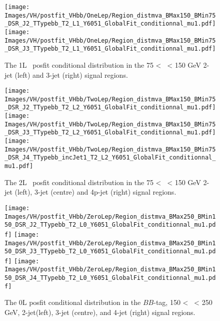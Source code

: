   \begin{figure}[h!]
    \centering
    \texttt{[image: Images/VH/postfit\_VHbb/OneLep/Region\_distmva\_BMax150\_BMin75\_DSR\_J2\_TTypebb\_T2\_L1\_Y6051\_GlobalFit\_conditionnal\_mu1.pdf]}
    \texttt{[image: Images/VH/postfit\_VHbb/OneLep/Region\_distmva\_BMax150\_BMin75\_DSR\_J3\_TTypebb\_T2\_L1\_Y6051\_GlobalFit\_conditionnal\_mu1.pdf]}
    \caption{The 1L \vhb\ posfit conditional distribution in the 75 < \ptv\ < 150 GeV 2-jet (left) and 3-jet (right) signal regions.}
    \label{fig:plotsVHBSR_75pt_1L}
  \end{figure} 
  
  \begin{figure}[h!]
    \centering
    \texttt{[image: Images/VH/postfit\_VHbb/TwoLep/Region\_distmva\_BMax150\_BMin75\_DSR\_J2\_TTypebb\_T2\_L2\_Y6051\_GlobalFit\_conditionnal\_mu1.pdf]}
    \texttt{[image: Images/VH/postfit\_VHbb/TwoLep/Region\_distmva\_BMax150\_BMin75\_DSR\_J3\_TTypebb\_T2\_L2\_Y6051\_GlobalFit\_conditionnal\_mu1.pdf]}
    \texttt{[image: Images/VH/postfit\_VHbb/TwoLep/Region\_distmva\_BMax150\_BMin75\_DSR\_J4\_TTypebb\_incJet1\_T2\_L2\_Y6051\_GlobalFit\_conditionnal\_mu1.pdf]}
    \caption{The 2L \vhb\ posfit conditional distribution in the 75 < \ptv\ < 150 GeV 2-jet (left), 3-jet (centre) and 4p-jet (right) signal regions.}
    \label{fig:plotsVHBSR_75pt_2L}
  \end{figure} 
  




\begin{figure}[h!]
    \centering
    \texttt{[image: Images/VH/postfit\_VHbb/ZeroLep/Region\_distmva\_BMax250\_BMin150\_DSR\_J2\_TTypebb\_T2\_L0\_Y6051\_GlobalFit\_conditionnal\_mu1.pdf]}
    \texttt{[image: Images/VH/postfit\_VHbb/ZeroLep/Region\_distmva\_BMax250\_BMin150\_DSR\_J3\_TTypebb\_T2\_L0\_Y6051\_GlobalFit\_conditionnal\_mu1.pdf]}
    \texttt{[image: Images/VH/postfit\_VHbb/ZeroLep/Region\_distmva\_BMax250\_BMin150\_DSR\_J4\_TTypebb\_T2\_L0\_Y6051\_GlobalFit\_conditionnal\_mu1.pdf]}
    \caption{The 0L posfit conditional distribution in the $BB$-tag, 150 < \ptv\ < 250 GeV, 2-jet(left), 3-jet (centre), and 4-jet (right) signal regions.}
    \label{fig:plotsVHBSR_150pt_0L}
\end{figure} 

